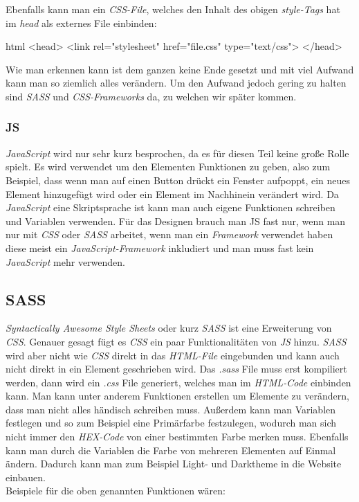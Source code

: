 		Ebenfalls kann man ein \textit{CSS-File}, welches den Inhalt des obigen \textit{style-Tags} hat im \textit{head} als externes File einbinden:
		\begin{code}{html}
			<head>
				<link rel="stylesheet" href="file.css" type="text/css">
			</head>
		\end{code}
		Wie man erkennen kann ist dem ganzen keine Ende gesetzt und mit viel Aufwand kann man so ziemlich alles verändern. Um den Aufwand jedoch gering zu halten sind \textit{SASS} und \textit{CSS-Frameworks} da, zu welchen wir später kommen.
		\cite{html5-css3-def}
		\cite{html5-css3-handbuch}
		\subsubsection{JS}
		\textit{JavaScript} wird nur sehr kurz besprochen, da es für diesen Teil keine große Rolle spielt. Es wird verwendet um den Elementen Funktionen zu geben, also zum Beispiel, dass wenn man auf einen Button drückt ein Fenster aufpoppt, ein neues Element hinzugefügt wird oder ein Element im Nachhinein verändert wird. Da \textit{JavaScript} eine Skriptsprache ist kann man auch eigene Funktionen schreiben und Variablen verwenden. Für das Designen brauch man JS fast nur, wenn man nur mit \textit{CSS} oder \textit{SASS} arbeitet, wenn man ein \textit{Framework} verwendet haben diese meist ein \textit{JavaScript-Framework} inkludiert und man muss fast kein \textit{JavaScript} mehr verwenden.
	\subsection{SASS}
	\textit{Syntactically Awesome Style Sheets} oder kurz \textit{SASS} ist eine Erweiterung von \textit{CSS}. Genauer gesagt fügt es \textit{CSS} ein paar Funktionalitäten von \textit{JS} hinzu. \textit{SASS} wird aber nicht wie \textit{CSS} direkt in das \textit{HTML-File} eingebunden und kann auch nicht direkt in ein Element geschrieben wird. Das \textit{.sass} File muss erst kompiliert werden, dann wird ein \textit{.css} File generiert, welches man im \textit{HTML-Code} einbinden kann. Man kann unter anderem Funktionen erstellen um Elemente zu verändern, dass man nicht alles händisch schreiben muss. Außerdem kann man Variablen festlegen und so zum Beispiel eine Primärfarbe festzulegen, wodurch man sich nicht immer den \textit{HEX-Code} von einer bestimmten Farbe merken muss. Ebenfalls kann man durch die Variablen die Farbe von mehreren Elementen auf Einmal ändern. Dadurch kann man zum Beispiel Light- und Darktheme in die Website einbauen.\\Beispiele für die oben genannten Funktionen wären:

